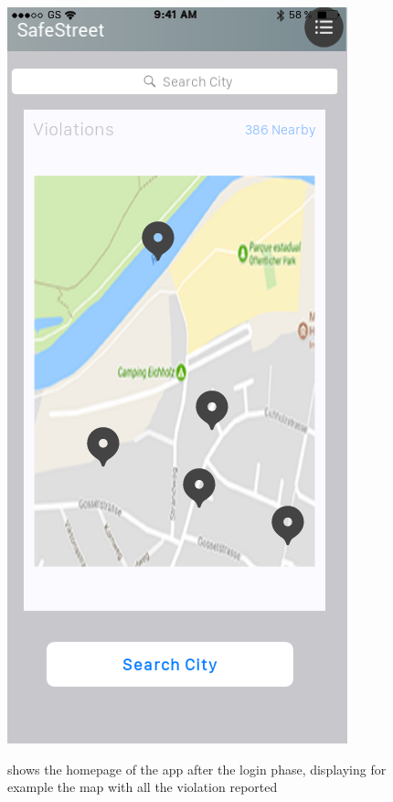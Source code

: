 \documentclass[../RASD.tex]{subfiles}
\begin{document}
            \begin{figure}[H]
                \centering
                \includegraphics[scale = 0.4]{assets/home.png}\\[1.6 cm]
                \caption[\textit{User} Home \textit{Mockup}]{shows the homepage of the app after the login phase, displaying for example the map with all the violation reported}
            \end{figure}
\end{document}
